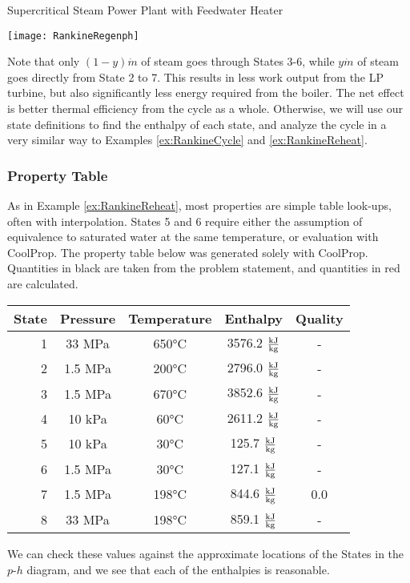 \begin{example}[label=ex:ch4FeedwaterHeater]{Supercritical Steam Power Plant with Feedwater Heater}
  \begin{center}
    \texttt{[image: RankineRegenph]}
  \end{center}

  Note that only $(1-y)\dot{m}$ of steam goes through States 3-6, while $y\dot{m}$ of steam goes directly from State 2 to 7.  This results in less work output from the LP turbine, but also significantly less energy required from the boiler.  The net effect is better thermal efficiency from the cycle as a whole.  Otherwise, we will use our state definitions to find the enthalpy of each state, and analyze the cycle in a very similar way to Examples \ref{ex:RankineCycle} and \ref{ex:RankineReheat}.

  \subsubsection*{Property Table}
  As in Example \ref{ex:RankineReheat}, most properties are simple table look-ups, often with interpolation.  States 5 and 6 require either the assumption of equivalence to saturated water at the same temperature, or evaluation with CoolProp.  The property table below was generated solely with CoolProp.  Quantities in black are taken from the problem statement, and quantities in red are calculated.
  \begin{table}[H]
    \centering
    \def\arraystretch{1.5}
    \begin{tabular}{r|cccc}
      State & Pressure & Temperature & Enthalpy & Quality \\ \hline
      1 & 33 MPa & 650°C & {\color{Red} 3576.2 $\frac{\rm kJ}{\rm kg}$} & - \\
      2 & 1.5 MPa & 200°C & {\color{Red} 2796.0 $\frac{\rm kJ}{\rm kg}$} & - \\
      3 & 1.5 MPa & 670°C & {\color{Red} 3852.6 $\frac{\rm kJ}{\rm kg}$} & - \\
      4 & 10 kPa &  60°C & {\color{Red} 2611.2 $\frac{\rm kJ}{\rm kg}$} & - \\
      5 & 10 kPa &  30°C & {\color{Red} 125.7 $\frac{\rm kJ}{\rm kg}$} & - \\
      6 & 1.5 MPa & 30°C & {\color{Red} 127.1 $\frac{\rm kJ}{\rm kg}$} & - \\
      7 & 1.5 MPa & {\color{Red} 198°C} & {\color{Red} 844.6 $\frac{\rm kJ}{\rm kg}$} & 0.0 \\
      8 & 33 MPa & {\color{Red} 198°C} & {\color{Red} 859.1 $\frac{\rm kJ}{\rm kg}$} & - \\
    \end{tabular}
    \def\arraystretch{1.0}
  \end{table}
  We can check these values against the approximate locations of the States in the $p$-$h$ diagram, and we see that each of the enthalpies is reasonable.


\end{example}
